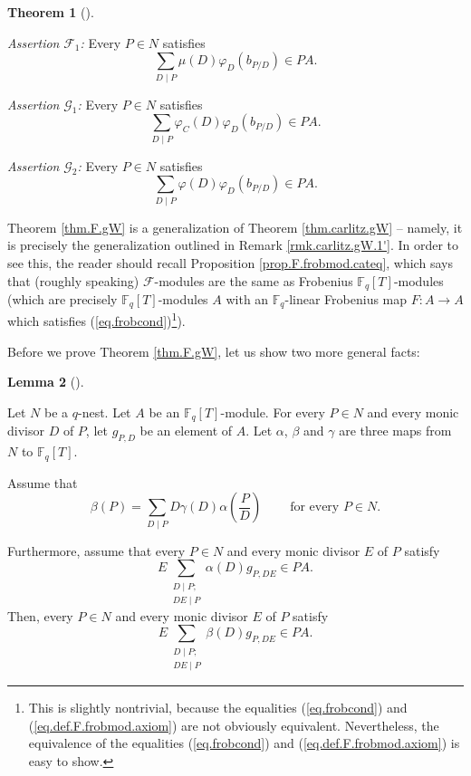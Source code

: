 \documentclass[numbers=enddot,12pt,final,onecolumn,notitlepage]{scrartcl}%
\theoremstyle{definition}
\newtheorem{theo}{Theorem}[section]
\newenvironment{theorem}[1][]
{\begin{theo}[#1]\begin{leftbar}}
{\end{leftbar}\end{theo}}
\newtheorem{lem}[theo]{Lemma}
\newenvironment{lemma}[1][]
{\begin{lem}[#1]\begin{leftbar}}
{\end{leftbar}\end{lem}}
\let\sumnonlimits\sum
\renewcommand{\sum}{\sumnonlimits\limits}
\begin{document}
\begin{theorem}
\textit{Assertion }$\mathcal{F}_{1}$\textit{:} Every $P\in N$ satisfies%
\[
\sum_{D\mid P}\mu\left(  D\right)  \varphi_{D}\left(  b_{P / D}\right)  \in
PA.
\]


\textit{Assertion }$\mathcal{G}_{1}$\textit{:} Every $P\in N$ satisfies%
\[
\sum_{D\mid P}\varphi_{C}\left(  D\right)  \varphi_{D}\left(  b_{P /
D}\right)  \in PA.
\]


\textit{Assertion }$\mathcal{G}_{2}$\textit{:} Every $P\in N$ satisfies%
\[
\sum_{D\mid P}\varphi\left(  D\right)  \varphi_{D}\left(  b_{P/D}\right)  \in
PA.
\]

\end{theorem}


Theorem \ref{thm.F.gW} is a generalization of Theorem \ref{thm.carlitz.gW} --
namely, it is precisely the generalization outlined in Remark
\ref{rmk.carlitz.gW.1'}. In order to see this, the reader should recall
Proposition \ref{prop.F.frobmod.cateq}, which says that (roughly speaking)
$\mathcal{F}$-modules are the same as Frobenius $\mathbb{F}_{q}\left[
T\right]  $-modules (which are precisely $\mathbb{F}_{q}\left[  T\right]
$-modules $A$ with an $\mathbb{F}_{q}$-linear Frobenius map $F:A\rightarrow A$
which satisfies (\ref{eq.frobcond})\footnote{This is slightly nontrivial,
because the equalities (\ref{eq.frobcond}) and (\ref{eq.def.F.frobmod.axiom})
are not obviously equivalent. Nevertheless, the equivalence of the equalities
(\ref{eq.frobcond}) and (\ref{eq.def.F.frobmod.axiom}) is easy to show.}).

Before we prove Theorem \ref{thm.F.gW}, let us show two more general facts:

\begin{lemma}
\label{lem.F.gW.F-G-gen0}Let $N$ be a $q$-nest. Let $A$ be an $\mathbb{F}%
_{q}\left[  T\right]  $-module. For every $P\in N$ and every monic divisor $D$
of $P$, let $g_{P,D}$ be an element of $A$. Let $\alpha$, $\beta$ and $\gamma$
are three maps from $N$ to $\mathbb{F}_{q}\left[  T\right]  $.

Assume that
\begin{equation}
\beta\left(  P\right)  =\sum_{D\mid P}D\gamma\left(  D\right)  \alpha\left(
\dfrac{P}{D}\right)  \ \ \ \ \ \ \ \ \ \ \text{for every }P\in N.
\label{eq.lem.F.gW.F-gen0.beta-through-alpha}%
\end{equation}


Furthermore, assume that every $P\in N$ and every monic divisor $E$ of $P$
satisfy%
\begin{equation}
E\sum_{\substack{D\mid P;\\DE\mid P}}\alpha\left(  D\right)  g_{P,DE}\in PA.
\label{eq.lem.F.gW.F-G-gen0.ass}%
\end{equation}
Then, every $P\in N$ and every monic divisor $E$ of $P$ satisfy%
\begin{equation}
E\sum_{\substack{D\mid P;\\DE\mid P}}\beta\left(  D\right)  g_{P,DE}\in PA.
\label{eq.lem.F.gW.F-G-gen0.claim}%
\end{equation}

\end{lemma}
\end{document}
